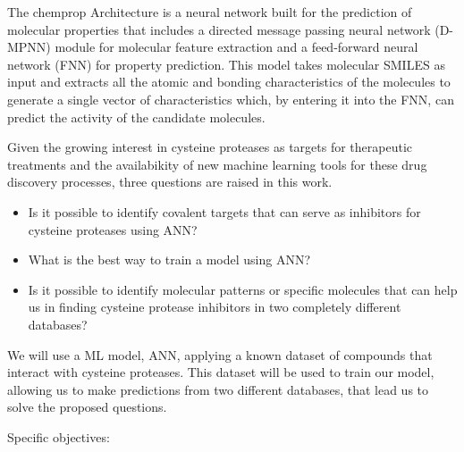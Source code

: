 \documentclass[final,times,twocolumn,article]{elsarticle}
\begin{document}
The chemprop Architecture is a neural network built for the prediction of molecular properties that includes a directed message passing neural network (D-MPNN) module for molecular feature extraction and a feed-forward neural network (FNN) for property prediction. This model takes molecular SMILES as input and extracts all the atomic and bonding characteristics of the molecules to generate a single vector of characteristics which, by entering it into the FNN, can predict the activity of the candidate molecules. \cite{Wang2022}

Given the growing interest in cysteine proteases as targets for therapeutic treatments and the availabikity of new machine learning tools for these drug discovery processes, three questions are raised in this work.

\begin{itemize}
    \item Is it possible to identify covalent targets that can serve as inhibitors for cysteine proteases using ANN?
    \item What is the best way to train a model using ANN?
    \item Is it possible to identify molecular patterns or specific molecules that can help us in finding cysteine protease inhibitors in two completely different databases?
    
\end{itemize}


We will use a ML model, ANN, applying a known dataset of compounds that interact with cysteine proteases. This dataset will be used to train our model, allowing us to make predictions from two different databases, that lead us to solve the proposed questions.

Specific objectives:
\end{document}
